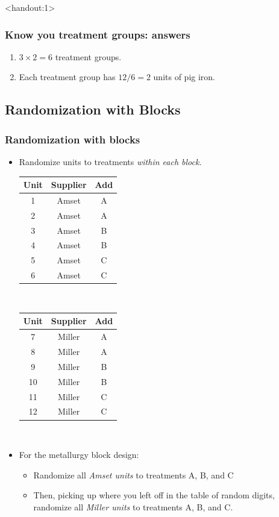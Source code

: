 \documentclass[handout]{beamer}\usepackage{graphicx, color}
\newcommand{\answers}{1}
\providecommand{\q}{$\quad$ \newline}
\numberwithin{equation}{section}
\begin{document}
\begin{frame}<handout:\answers>
\frametitle{Know you treatment groups: answers}

\begin{enumerate}[1. ]
\item $3 \times 2 = 6$ treatment groups.
\pause \item Each treatment group has $12 / 6 = 2$ units of pig iron.
\end{enumerate}

\end{frame}


\subsection{Randomization with Blocks}

\begin{frame}
\frametitle{Randomization with blocks}
\small
\begin{itemize}
\item Randomize units to treatments \emph{within each block}. \q

\begin{tabular}{c|c|c}
Unit & Supplier & Add\\ \hline
1 & Amset & A \\ 
2 & Amset & A \\ 
3 & Amset & B \\ 
4 & Amset & B \\ 
5 & Amset & C \\
6 & Amset & C \\
\end{tabular} $\quad$ \begin{tabular}{c|c|c}
Unit & Supplier & Add \\ \hline
7 & Miller & A \\ 
8 & Miller & A\\ 
9 & Miller & B \\ 
10 & Miller & B \\ 
11 & Miller & C \\ 
12 & Miller & C \\ 
\end{tabular} \q

\pause \item For the metallurgy block design:

\begin{itemize}
\item Randomize all \emph{Amset units} to treatments A, B, and C
\pause \item Then, picking up where you left off in the  table of random digits,
randomize all \emph{Miller units} to treatments A, B, and C.
\end{itemize}
\end{itemize}


\end{frame}
\end{document}
